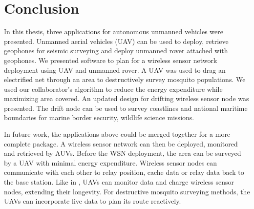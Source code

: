 
\chapter[Conclusion]{Conclusion}
\label{chap-conc}

In this thesis, three applications for autonomous unmanned vehicles were presented.
Unmanned aerial vehicles (UAV) can be used to deploy, retrieve geophones for seismic surveying and deploy unmanned rover attached with geophones.
We presented software to plan for a wireless sensor network deployment using UAV and unmanned rover.
A UAV was used to drag an electrified net through an area to destructively survey mosquito populations.
We used our collaborator's algorithm to reduce the energy expenditure while maximizing area covered.
An updated design for drifting wireless sensor node was presented.
The drift node can be used to survey coastlines and national maritime boundaries for marine border security, wildlife science missions.

In future work, the applications above could be merged together for a more complete package.
A wireless sensor network can then be deployed, monitored and retrieved by AUVs.
Before the WSN deployment, the area can be surveyed by a UAV with minimal energy expenditure.
Wireless sensor nodes can communicate with each other to relay position, cache data or relay data back to the base station.
Like in \cite{sudarshanwsn}, UAVs can monitor data and charge wireless sensor nodes, extending their longevity.
For destructive mosquito surveying methods, the UAVs can incorporate live data to plan its route reactively.

